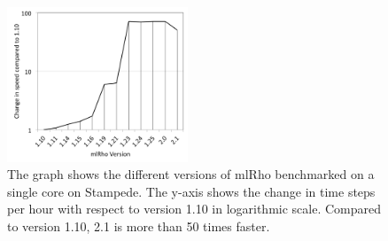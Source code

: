 \documentclass{sig-alternate}
\newcommand{\abhi}[1]{ {\textcolor{red} { ***Abhinav: #1 }}}
\newcommand{\abhi}[1]{ {}}
\begin{document}
\begin{figure} %
\centering
\includegraphics[width=0.48\textwidth]{figures/mlrho-benchmarks.png}
\caption{The graph shows the different versions of mlRho benchmarked on a single core on Stampede. The y-axis shows the change in time steps per hour with respect to version 1.10 in logarithmic scale. Compared to version 1.10,  2.1 is more than 50 times faster. }
\label{fig:stampede-bench}
\end{figure}

%

\end{document}
